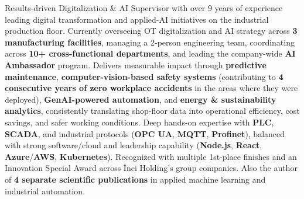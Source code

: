 \vspace{0mm}


\begin{cvparagraph}

Results-driven Digitalization \& AI Supervisor with over 9 years of experience leading digital transformation and applied-AI initiatives on the industrial production floor. Currently overseeing OT digitalization and AI strategy across \textbf{3 manufacturing facilities}, managing a 2-person engineering team, coordinating across \textbf{10+ cross-functional departments}, and leading the company-wide \textbf{AI Ambassador} program. Delivers measurable impact through \textbf{predictive maintenance}, \textbf{computer-vision-based safety systems} (contributing to \textbf{4 consecutive years of zero workplace accidents} in the areas where they were deployed), \textbf{GenAI-powered automation}, and \textbf{energy \& sustainability analytics}, consistently translating shop-floor data into operational efficiency, cost savings, and safer working conditions. Deep hands-on expertise with \textbf{PLC}, \textbf{SCADA}, and industrial protocols (\textbf{OPC UA}, \textbf{MQTT}, \textbf{Profinet}), balanced with strong software/cloud and leadership capability (\textbf{Node.js}, \textbf{React}, \textbf{Azure}/\textbf{AWS}, \textbf{Kubernetes}). Recognized with multiple 1st-place finishes and an Innovation Special Award across İnci Holding's group companies. Also the author of \textbf{4 separate scientific publications} in applied machine learning and industrial automation.
\end{cvparagraph}
